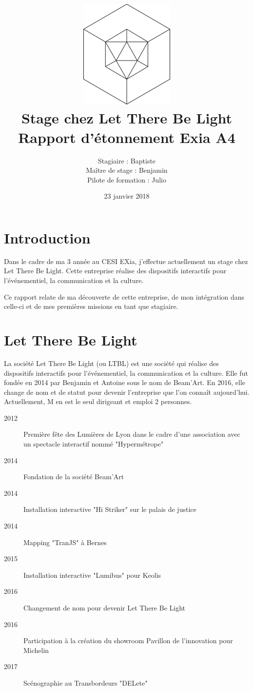 \documentclass{article}
\title{\includegraphics{logo.png}\vspace{2cm}\\Stage chez Let There Be Light \\ \large Rapport d'étonnement Exia A4}
\date{23 janvier 2018}
\author{Stagiaire : Baptiste \bsc{Saclier} \\ Maître de stage : Benjamin \bsc{Petit}\\Pilote de formation : Julio \bsc{Santilario}}
\begin{document}
\maketitle

\clearpage

\tableofcontents

\section{Introduction}

Dans le cadre de ma 3 année au CESI EXia, j'effectue actuellement un stage chez Let There Be Light.
Cette entreprise réalise des dispositifs interactifs pour l'événementiel, la communication et la culture.

Ce rapport relate de ma découverte de cette entreprise, de mon intégration dans celle-ci et de mes premières missions en tant que stagiaire.

\clearpage

\section{Let There Be Light}

La société Let There Be Light (ou LTBL) est une société qui réalise des dispositifs interactifs pour l'événementiel, la communication et la culture.
Elle fut fondée en 2014 par Benjamin  et Antoine  sous le nom de Beam'Art.
En 2016, elle change de nom et de statut pour devenir l'entreprise que l'on connaît aujourd'hui.
Actuellement, M  en est le seul dirigeant et emploi 2 personnes.

\begin{description}
    \item[2012] Première fête des Lumières de Lyon dans le cadre d'une association avec un spectacle interactif nommé "Hypermétrope"
    \item[2014] Fondation de la société Beam'Art
    \item[2014] Installation interactive "Hi Striker" sur le palais de justice
    \item[2014] Mapping "TranJS" à Bernes
    \item[2015] Installation interactive "Lumibus" pour Keolis
    \item[2016] Changement de nom pour devenir Let There Be Light
    \item[2016] Participation à la création du showroom Pavillon de l'innovation pour Michelin
    \item[2017] Scénographie au Transbordeurs "DELete"
\end{description}
\end{document}
